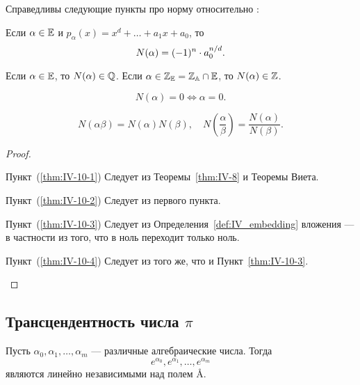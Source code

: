 \begin{ntheorem}
\label{thm:IV-10}
    Справедливы следующие пункты про норму относительно \EE:
    \begin{statesp}
        \item
        \label{thm:IV-10-1}
            Если $\alpha \in \mathbb{E}$ и $p_{\alpha}(x) = x^d + \dots + a_1 x + a_0$, то
            \[
                N(\alpha) = (-1)^n \cdot a_0^{n / d}.
            \]
        \item
        \label{thm:IV-10-2}
            Если $\alpha \in \mathbb{E}$, то $N(\alpha) \in \mathbb{Q}$. 
            Если $\alpha \in \mathbb{Z}_{\mathbb{E}} = \mathbb{Z}_{\mathbb{A}} \cap \mathbb{E}$, то $N(\alpha) \in \mathbb{Z}$.
        \item
        \label{thm:IV-10-3}
            \[
                N(\alpha) = 0 \Leftrightarrow \alpha = 0.
            \]
        \item
        \label{thm:IV-10-4}
            \[
                N(\alpha\beta) = N(\alpha)N(\beta), \quad N\left( \frac{\alpha}{\beta} \right) = \frac{N(\alpha)}{N(\beta)}.
            \]
    \end{statesp}
\end{ntheorem}
\begin{proof}
\hfill
    \begin{statesp}
        \item[Пункт~(\ref{thm:IV-10-1})]
            Следует из Теоремы~\ref{thm:IV-8} и Теоремы Виета.
        \item[Пункт~(\ref{thm:IV-10-2})]
            Следует из первого пункта.
        \item[Пункт~(\ref{thm:IV-10-3})]
            Следует из Определения~\ref{def:IV_embedding} вложения --- в частности из того, что в ноль переходит только ноль.
        \item[Пункт~(\ref{thm:IV-10-4})]
            Следует из того же, что и Пункт~\ref{thm:IV-10-3}.
    \end{statesp}
\end{proof}


\subsection{\texorpdfstring{Трансцендентность числа $\pi$}{Трансцендентность числа π}}
\label{subsec:IV-5}

\begin{ntheorem}
\label{thm:IV-11}
    Пусть $\alpha_0, \alpha_1, \dots, \alpha_m$ --- различные алгебраические числа. Тогда
    \[
        e^{\alpha_0}, e^{\alpha_1}, \dots, e^{\alpha_m}
    \]
    являются линейно независимыми над полем \AA.
\end{ntheorem}

